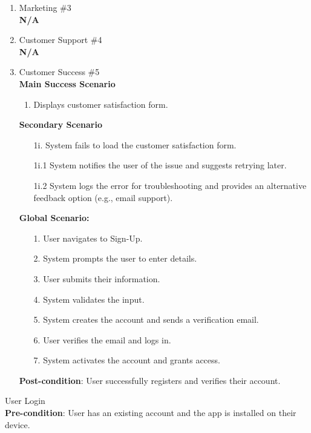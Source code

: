 \documentclass{article}
\begin{document}
\begin{enumerate}[{\bf BE1.}]
\begin{enumerate}[{\bf VP1.}]
 \item Marketing \#3 \\
	\textbf{N/A}

\item Customer Support \#4 \\
	\textbf{N/A}  

\item Customer Success \#5 \\
    \textbf{Main Success Scenario}
    \begin{enumerate}
		\item Displays customer satisfaction form.
    \end{enumerate}
    \textbf{Secondary Scenario}
   \begin{enumerate}
		\item[1i.] System fails to load the customer satisfaction form.
            \item[1i.1] System notifies the user of the issue and suggests retrying later.
            \item[1i.2] System logs the error for troubleshooting and provides an alternative feedback option (e.g., email support).
    \end{enumerate} 
	\textbf{Global Scenario:}

	\begin{enumerate}
		\item[1.] User navigates to Sign-Up.
		\item[2.] System prompts the user to enter details.
		\item[3.] User submits their information.
		\item[4.] System validates the input.
		\item[5.] System creates the account and sends a verification email.
		\item[6.] User verifies the email and logs in.
		\item[7.] System activates the account and grants access.
	\end{enumerate}

	\textbf{Post-condition}:  User successfully registers and verifies their account.

	

\end{enumerate}
{\color{red}
\item User Login \\
\textbf{Pre-condition}: User has an existing account and the app is installed on their device.  

}
\end{enumerate}
\end{document}
